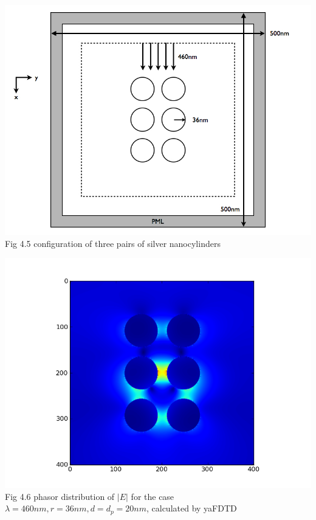 \documentclass[openany]{book}
\begin{document}
\begin{center}
\includegraphics[scale=0.5]{images/open-cavity-config.jpg}\\
Fig 4.5
configuration of three pairs of silver nanocylinders
\end{center}
\begin{center}
\includegraphics[scale=0.8]{images/etotal.png}\\
Fig 4.6
phasor distribution of $|E|$ for the case $\lambda = 460nm, r = 36nm, d = d_p = 20nm$, calculated by yaFDTD
\end{center}
\end{document}
